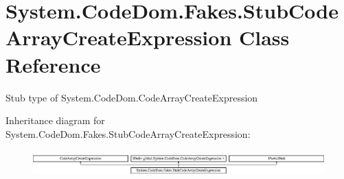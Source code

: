 \hypertarget{class_system_1_1_code_dom_1_1_fakes_1_1_stub_code_array_create_expression}{\section{System.\-Code\-Dom.\-Fakes.\-Stub\-Code\-Array\-Create\-Expression Class Reference}
\label{class_system_1_1_code_dom_1_1_fakes_1_1_stub_code_array_create_expression}
}


Stub type of System.\-Code\-Dom.\-Code\-Array\-Create\-Expression 


Inheritance diagram for System.\-Code\-Dom.\-Fakes.\-Stub\-Code\-Array\-Create\-Expression\-:\begin{figure}[H]
\begin{center}
\leavevmode
\includegraphics[height=0.992908cm]{class_system_1_1_code_dom_1_1_fakes_1_1_stub_code_array_create_expression}
\end{center}
\end{figure}
